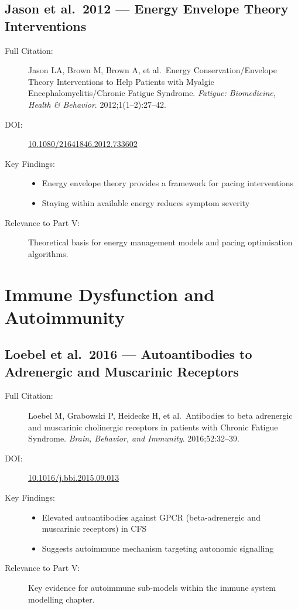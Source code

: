 \subsection{Jason et al.\ 2012 --- Energy Envelope Theory Interventions}

\begin{description}
    \item[Full Citation:] Jason LA, Brown M, Brown A, et al.\ Energy Conservation/Envelope Theory Interventions to Help Patients with Myalgic Encephalomyelitis/Chronic Fatigue Syndrome. \textit{Fatigue: Biomedicine, Health \& Behavior}. 2012;1(1--2):27--42. \cite{jason2012energy}
    \item[DOI:] \href{https://doi.org/10.1080/21641846.2012.733602}{10.1080/21641846.2012.733602}
    \item[Key Findings:]
    \begin{itemize}
        \item Energy envelope theory provides a framework for pacing interventions
        \item Staying within available energy reduces symptom severity
    \end{itemize}
    \item[Relevance to Part V:] Theoretical basis for energy management models and pacing optimisation algorithms.
\end{description}

\section{Immune Dysfunction and Autoimmunity}
\label{sec:bib-immune-additions}

\subsection{Loebel et al.\ 2016 --- Autoantibodies to Adrenergic and Muscarinic Receptors}

\begin{description}
    \item[Full Citation:] Loebel M, Grabowski P, Heidecke H, et al.\ Antibodies to beta adrenergic and muscarinic cholinergic receptors in patients with Chronic Fatigue Syndrome. \textit{Brain, Behavior, and Immunity}. 2016;52:32--39. \cite{Loebel2016}
    \item[DOI:] \href{https://doi.org/10.1016/j.bbi.2015.09.013}{10.1016/j.bbi.2015.09.013}
    \item[Key Findings:]
    \begin{itemize}
        \item Elevated autoantibodies against GPCR (beta-adrenergic and muscarinic receptors) in CFS
        \item Suggests autoimmune mechanism targeting autonomic signalling
    \end{itemize}
    \item[Relevance to Part V:] Key evidence for autoimmune sub-models within the immune system modelling chapter.
\end{description}

